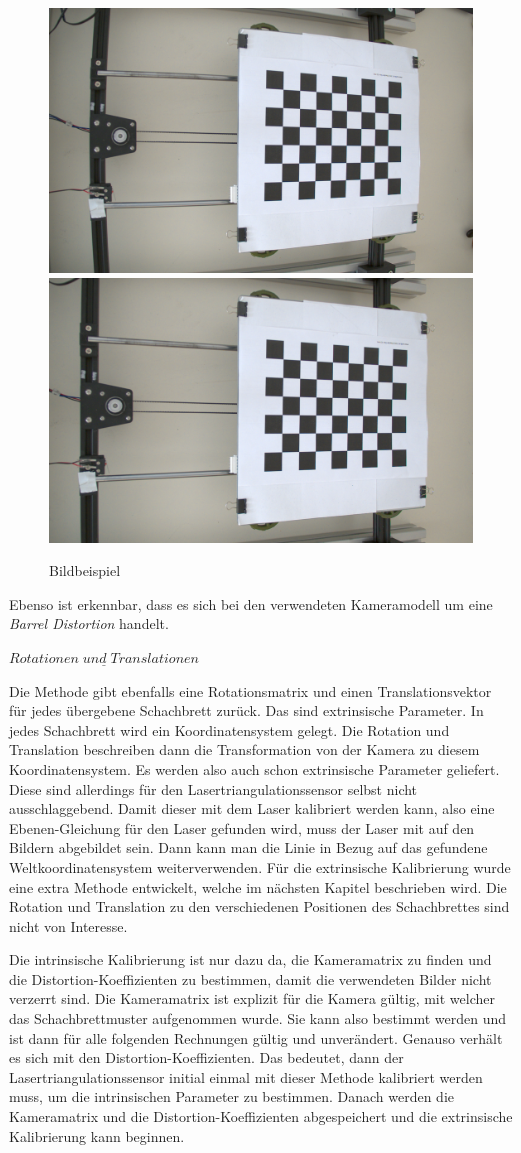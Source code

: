 		\begin{figure}[h]
			\centering
			\includegraphics[width=0.49\linewidth]{img/hauptteil/calibration/distorted.png}
			\includegraphics[width=0.49\linewidth]{img/hauptteil/calibration/undistorted.png}
			\caption[Beispiel für die Verzerrung in Bildern]{Bildbeispiel}
			\label{fig:distortion_bsp}
		\end{figure}
	
		Ebenso ist erkennbar, dass es sich bei den verwendeten Kameramodell um eine \textit{Barrel Distortion} handelt.
		
		$\underline{Rotationen \; und \; Translationen}$
		
		Die Methode gibt ebenfalls eine Rotationsmatrix und einen Translationsvektor für jedes übergebene Schachbrett zurück. Das sind extrinsische Parameter. In jedes Schachbrett wird ein Koordinatensystem gelegt. Die Rotation und Translation beschreiben dann die Transformation von der Kamera zu diesem Koordinatensystem. Es werden also auch schon extrinsische Parameter geliefert. Diese sind allerdings für den Lasertriangulationssensor selbst nicht ausschlaggebend. Damit dieser mit dem Laser kalibriert werden kann, also eine Ebenen-Gleichung für den Laser gefunden wird, muss der Laser mit auf den Bildern abgebildet sein. Dann kann man die Linie in Bezug auf das gefundene Weltkoordinatensystem weiterverwenden. Für die extrinsische Kalibrierung wurde eine extra Methode entwickelt, welche im nächsten Kapitel beschrieben wird. Die Rotation und Translation zu den verschiedenen Positionen des Schachbrettes sind nicht von Interesse. 
		
		Die intrinsische Kalibrierung ist nur dazu da, die Kameramatrix zu finden und die Distortion-Koeffizienten zu bestimmen, damit die verwendeten Bilder nicht verzerrt sind. Die Kameramatrix ist explizit für die Kamera gültig, mit welcher das Schachbrettmuster aufgenommen wurde. Sie kann also bestimmt werden und ist dann für alle folgenden Rechnungen gültig und unverändert. Genauso verhält es sich mit den Distortion-Koeffizienten. Das bedeutet, dann der Lasertriangulationssensor initial einmal mit dieser Methode kalibriert werden muss, um die intrinsischen Parameter zu bestimmen. Danach werden die Kameramatrix und die Distortion-Koeffizienten abgespeichert und die extrinsische Kalibrierung kann beginnen. 
			\label{chap:kalibrierung_intrinsisch}
